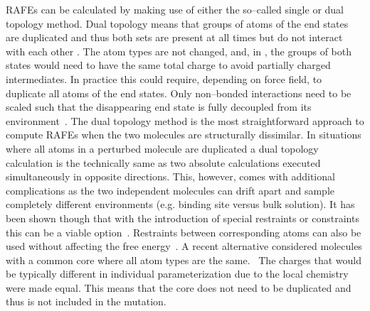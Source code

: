\documentclass[journal=jctcce,manuscript=article]{achemso}
\providecommand{\DIFadd}[1]{\protect\cbstart{\protect\color{blue}\uwave{#1}}\protect\cbend} %
\providecommand{\DIFdel}[1]{\protect\cbdelete{\protect\color{red}\sout{#1}}\protect\cbdelete} %
\providecommand{\DIFaddbegin}{} %
\providecommand{\DIFaddend}{} %
\providecommand{\DIFdelbegin}{} %
\providecommand{\DIFdelend}{} %
\newcommand{\DIFscaledelfig}{0.5}
\newlength{\DIFdelgraphicswidth} %
\newlength{\DIFdelgraphicsheight} %
\newcommand{\DIFaddincludegraphics}[2][]{{\color{blue}\fbox{\DIFOincludegraphics[#1]{#2}}}} %
\newcommand{\DIFdelincludegraphics}[2][]{%
\sbox{\DIFdelgraphicsbox}{\DIFOincludegraphics[#1]{#2}}%
\settoboxwidth{\DIFdelgraphicswidth}{\DIFdelgraphicsbox} %
\settoboxtotalheight{\DIFdelgraphicsheight}{\DIFdelgraphicsbox} %
\scalebox{\DIFscaledelfig}{%
\parbox[b]{\DIFdelgraphicswidth}{\usebox{\DIFdelgraphicsbox}\\[-\baselineskip] \rule{\DIFdelgraphicswidth}{0em}}\llap{\resizebox{\DIFdelgraphicswidth}{\DIFdelgraphicsheight}{%
\setlength{\unitlength}{\DIFdelgraphicswidth}%
\begin{picture}(1,1)%
\thicklines\linethickness{2pt} %
{\color[rgb]{1,0,0}\put(0,0){\framebox(1,1){}}}%
{\color[rgb]{1,0,0}\put(0,0){\line( 1,1){1}}}%
{\color[rgb]{1,0,0}\put(0,1){\line(1,-1){1}}}%
\end{picture}%
}\hspace*{3pt}}} %
} %
\DeclareRobustCommand{\DIFaddbegin}{\DIFOaddbegin \let\includegraphics\DIFaddincludegraphics} %
\DeclareRobustCommand{\DIFaddend}{\DIFOaddend \let\includegraphics\DIFOincludegraphics} %
\DeclareRobustCommand{\DIFdelbegin}{\DIFOdelbegin \let\includegraphics\DIFdelincludegraphics} %
\DeclareRobustCommand{\DIFdelend}{\DIFOaddend \let\includegraphics\DIFOincludegraphics} %
\begin{document}
RAFEs can be calculated by making use of either the so--called single or dual topology method.
Dual topology means that groups of atoms of the end states are
duplicated and thus both sets are present at all
times but do not interact with each other \cite{doi:10.1021/j100056a020, doi:10.1021/jp981628n}.  The atom types are not changed, and, in \DIFdelbegin \DIFdel{principal}\DIFdelend \DIFaddbegin \DIFadd{principle}\DIFaddend , the groups
of both states would need to have the same total charge to avoid partially
charged intermediates.  In practice this could require, depending on force field,
to duplicate all atoms of the end states.  Only non--bonded
interactions need to be scaled such that the disappearing end state
is fully decoupled from its environment~\cite{doi:10.1021/jp981628n}.
The dual topology method is the most straightforward approach to compute RAFEs when the two molecules are structurally dissimilar.
In situations where all atoms in a perturbed molecule are duplicated a dual topology calculation is the technically same as two absolute calculations \DIFdelbegin \DIFdel{, }\DIFdelend executed simultaneously in opposite directions.
This, however, comes with additional complications as the two independent
molecules can drift apart and sample completely different environments (e.g. binding site versus bulk solution).
It has been shown though that with the introduction of
special restraints or constraints this can be a viable
option~\cite{doi:10.1021/ct700081t, rocklin_separated_2013, JCC:Axelsen-Li}.
Restraints between corresponding atoms can also be used without affecting the free
energy~\cite{JCC:Axelsen-Li}.  A recent
alternative considered molecules with a
common core where all atom types are the same.~\cite{acs.jctc.6b00794}  The charges that would be
typically different in individual parameterization due to the local chemistry
were made equal.  This means that the core does not need to be duplicated and
thus is not included in the mutation.
\end{document}
